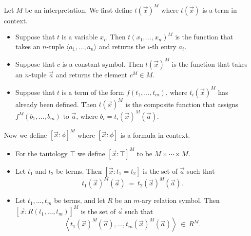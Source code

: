 Let $M$ be an interpretation.  We first define $t(\vec{x})^M$ where
$t(\vec{x})$ is a term in context.
\begin{itemize}
\item Suppose that $t$ is a variable $x_i$.  Then
  $t(x_1,\dots ,x_n)^M$ is the function that takes an $n$-tuple
  $\langle a_1,\dots ,a_n\rangle$ and returns the $i$-th entry $a_i$.
\item Suppose that $c$ is a constant symbol.  Then $t(\vec{x})^M$ is
  the function that takes an $n$-tuple $\vec{a}$ and returns the
  element $c^M\in M$.
\item Suppose that $t$ is a term of the form $f(t_1,\dots ,t_m)$,
  where $t_i(\vec{x})^M$ has already been defined.  Then
  $t(\vec{x})^M$ is the composite function that assigns
  $f^M(b_1,\dots ,b_m)$ to $\vec{a}$, where
  $b_i=t_i(\vec{x})^M(\vec{a})$.
 \end{itemize}

 \bigskip \noindent Now we define $[\vec{x}:\phi ]^M$ where
 $[\vec{x}:\phi ]$ is a formula in context.
 \begin{itemize}
 \item For the tautology $\top$ we define $[\vec{x}:\top ]^M$ to be
   $M\times\cdots\times M$.
\item Let $t_1$ and $t_2$ be terms.  Then $[\vec{x}:t_1=t_2]$ is the
  set of $\vec{a}$ such that 
\[ t_1(\vec{x})^M(\vec{a}) \:= \: t_2(\vec{x})^M(\vec{a}) .\]
\item Let $t_1,\dots ,t_m$ be terms, and let $R$ be an $m$-ary
  relation symbol.  Then $[\vec{x}:R(t_1,\dots ,t_m)]^M$ is the
  set of $\vec{a}$ such that
  \[ \left\langle t_1(\vec{x})^M(\vec{a}),\dots
      ,t_m(\vec{x})^M(\vec{a})\right\rangle \: \in \: R^M .\] 
\end{itemize}


